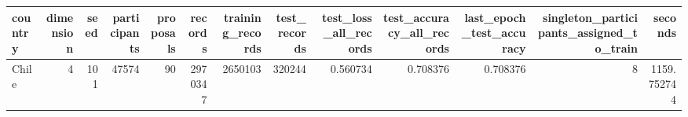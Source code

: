 \begin{tabular}{lrrrrrrrrrrrr}
\toprule
country & dimension & seed & participants & proposals & records & training_records & test_records & test_loss_all_records & test_accuracy_all_records & last_epoch_test_accuracy & singleton_participants_assigned_to_train & seconds \\
\midrule
Chile & 4 & 101 & 47574 & 90 & 2970347 & 2650103 & 320244 & 0.560734 & 0.708376 & 0.708376 & 8 & 1159.752744 \\
\bottomrule
\end{tabular}
